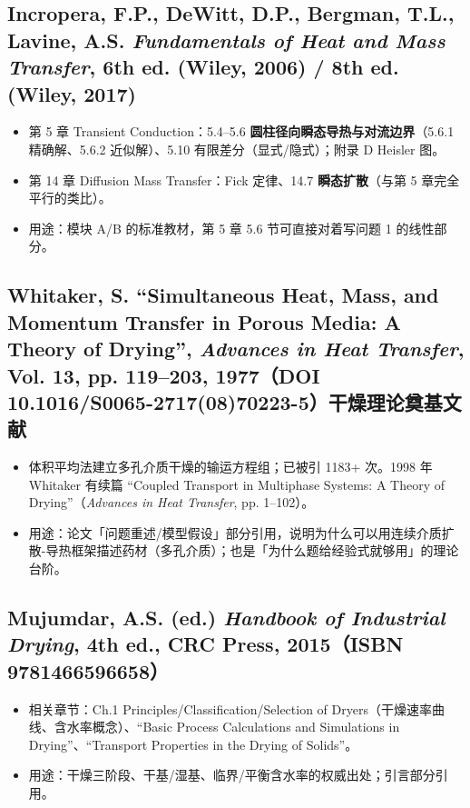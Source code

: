 \documentclass[12pt,a4paper]{ctexart}
\begin{document}
\subsection{Incropera, F.P., DeWitt, D.P., Bergman, T.L., Lavine, A.S. \textit{Fundamentals of Heat and Mass Transfer}, 6th ed. (Wiley, 2006) / 8th ed. (Wiley, 2017)}
\begin{itemize}
\item 第 5 章 Transient Conduction：5.4--5.6 \textbf{圆柱径向瞬态导热与对流边界}（5.6.1 精确解、5.6.2 近似解）、5.10 有限差分（显式/隐式）；附录 D Heisler 图。
\item 第 14 章 Diffusion Mass Transfer：Fick 定律、14.7 \textbf{瞬态扩散}（与第 5 章完全平行的类比）。
\item 用途：模块 A/B 的标准教材，第 5 章 5.6 节可直接对着写问题 1 的线性部分。
\end{itemize}

\subsection{Whitaker, S. ``Simultaneous Heat, Mass, and Momentum Transfer in Porous Media: A Theory of Drying'', \textit{Advances in Heat Transfer}, Vol. 13, pp. 119--203, 1977（DOI 10.1016/S0065-2717(08)70223-5）\quad 干燥理论奠基文献}
\begin{itemize}
\item 体积平均法建立多孔介质干燥的输运方程组；已被引 1183+ 次。1998 年 Whitaker 有续篇 ``Coupled Transport in Multiphase Systems: A Theory of Drying''（\textit{Advances in Heat Transfer}, pp. 1--102）。
\item 用途：论文「问题重述/模型假设」部分引用，说明为什么可以用连续介质扩散-导热框架描述药材（多孔介质）；也是「为什么题给经验式就够用」的理论台阶。
\end{itemize}

\subsection{Mujumdar, A.S. (ed.) \textit{Handbook of Industrial Drying}, 4th ed., CRC Press, 2015（ISBN 9781466596658）}
\begin{itemize}
\item 相关章节：Ch.1 Principles/Classification/Selection of Dryers（干燥速率曲线、含水率概念）、``Basic Process Calculations and Simulations in Drying''、``Transport Properties in the Drying of Solids''。
\item 用途：干燥三阶段、干基/湿基、临界/平衡含水率的权威出处；引言部分引用。
\end{itemize}
\end{document}
